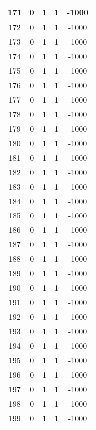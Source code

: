 \documentclass[letterpaper, 12pt]{article}
\begin{document}
\begin{longtable}{|c|c|c|c|c|}
\hline
171 & 0 & 1 & 1 & -1000 \\
\hline
172 & 0 & 1 & 1 & -1000 \\
\hline
173 & 0 & 1 & 1 & -1000 \\
\hline
174 & 0 & 1 & 1 & -1000 \\
\hline
175 & 0 & 1 & 1 & -1000 \\
\hline
176 & 0 & 1 & 1 & -1000 \\
\hline
177 & 0 & 1 & 1 & -1000 \\
\hline
178 & 0 & 1 & 1 & -1000 \\
\hline
179 & 0 & 1 & 1 & -1000 \\
\hline
180 & 0 & 1 & 1 & -1000 \\
\hline
181 & 0 & 1 & 1 & -1000 \\
\hline
182 & 0 & 1 & 1 & -1000 \\
\hline
183 & 0 & 1 & 1 & -1000 \\
\hline
184 & 0 & 1 & 1 & -1000 \\
\hline
185 & 0 & 1 & 1 & -1000 \\
\hline
186 & 0 & 1 & 1 & -1000 \\
\hline
187 & 0 & 1 & 1 & -1000 \\
\hline
188 & 0 & 1 & 1 & -1000 \\
\hline
189 & 0 & 1 & 1 & -1000 \\
\hline
190 & 0 & 1 & 1 & -1000 \\
\hline
191 & 0 & 1 & 1 & -1000 \\
\hline
192 & 0 & 1 & 1 & -1000 \\
\hline
193 & 0 & 1 & 1 & -1000 \\
\hline
194 & 0 & 1 & 1 & -1000 \\
\hline
195 & 0 & 1 & 1 & -1000 \\
\hline
196 & 0 & 1 & 1 & -1000 \\
\hline
197 & 0 & 1 & 1 & -1000 \\
\hline
198 & 0 & 1 & 1 & -1000 \\
\hline
199 & 0 & 1 & 1 & -1000 \\
\hline
\end{longtable}
\end{document}
